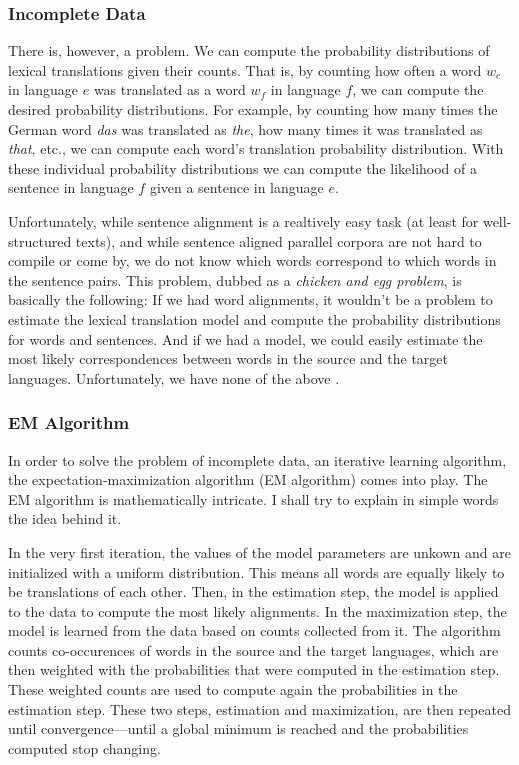 \subsubsection{Incomplete Data}
There is, however, a problem. 
We can compute the probability distributions of lexical translations given their counts. 
That is, by counting how often a word $w_e$ in language $e$ was translated as a word $w_f$ in language $f$, we can compute the desired probability distributions. 
For example, by counting how many times the German word \emph{das} was translated as \emph{the}, how many times it was translated as \emph{that}, etc., we can compute each word's translation probability distribution. 
With these individual probability distributions we can compute the likelihood of a sentence in language $f$ given a sentence in language $e$.

Unfortunately, while sentence alignment is a realtively easy task (at least for well-structured texts), and while sentence aligned parallel corpora are not hard to compile or come by, we do not know which words correspond to which words in the sentence pairs. 
This problem, dubbed as a \emph{chicken and egg problem}, is basically the following: If we had word alignments, it wouldn't be a problem to estimate the lexical translation model and compute the probability distributions for words and sentences. 
And if we had a model, we could easily estimate the most likely correspondences between words in the source and the target languages. 
Unfortunately, we have none of the above \autocite[88]{koehn2009}.

\subsubsection{EM Algorithm} 
In order to solve the problem of incomplete data, an iterative learning algorithm, the expectation-maximization algorithm (EM algorithm) comes into play. 
The EM algorithm is mathematically intricate. 
I shall try to explain in simple words the idea behind it. 

In the very first iteration, the values of the model parameters are unkown and are initialized with a uniform distribution. 
This means all words are equally likely to be translations of each other.
Then, in the estimation step, the model is applied to the data to compute the most likely alignments. 
In the maximization step, the model is learned from the data based on counts collected from it. 
The algorithm counts co-occurences of words in the source and the target languages, which are then weighted with the probabilities that were computed in the estimation step.
These weighted counts are used to compute again the probabilities in the estimation step. 
These two steps, estimation and maximization, are then repeated until convergence---until a global minimum is reached and the probabilities computed stop changing.

